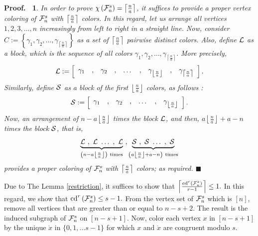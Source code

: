 \documentclass[11pt]{article}
\newtheorem{preproof}{{\bf Proof.\ }}
\newenvironment{proof}[1]{\begin{preproof}{\rm
               #1}\hfill{$\blacksquare$}}{\end{preproof}}
\begin{document}
\begin{proof}
{		\noindent
		In order to prove
		$\chi \left(  {\cal F}_{n}^{s}  \right) = \left\lceil   \frac{n}{a}   \right\rceil$,
		it suffices to provide a proper vertex coloring of $ {\cal F}_{n}^{s} $
		with $\left\lceil   \frac{n}{a}   \right\rceil$ colors.
		In this regard, let us arrange all vertices $1, 2, 3, \dots , n$ increasingly from left to right in a straight line.
		Now, consider $C:= \left\{\gamma _{1} , \gamma _{2} , \dots , \gamma _{\left\lceil   \frac{n}{a}   \right\rceil} \right\}$ as a set of $\left\lceil   \frac{n}{a}   \right\rceil$ pairwise distinct colors. Also, define ${\cal L}$ as a block, which is the sequence of all colors $\gamma _{1} , \gamma _{2} , \dots , \gamma _{\left\lceil   \frac{n}{a}   \right\rceil}.$ More precisely,
		$${\cal L} := \left[\begin{array}{ccccccccc}
			\gamma _{1} &  ,   &   \gamma _{2} &  ,   &    \dots &   ,   &   \gamma _{\left\lfloor \frac{n}{a} \right\rfloor}  &  ,   &   
			\gamma _{\left\lceil   \frac{n}{a}   \right\rceil}
		\end{array}\right] .$$
		Similarly, define ${\cal S}$ as a block of the first
		$\left\lfloor \frac{n}{a} \right\rfloor$ colors, as follows :
		$${\cal S} := \left[\begin{array}{ccccccc}
			\gamma _{1} &  ,   &   \gamma _{2} &  ,   &    \dots &   ,   &   \gamma _{\left\lfloor \frac{n}{a} \right\rfloor}  
		\end{array}\right] .$$
		Now, an arrangement of $  n-a {\left\lfloor \frac{n}{a} \right\rfloor} $
		times the block ${\cal L}$, and then, $a {\left\lfloor \frac{n}{a} \right\rfloor} + a - n$
		times the block ${\cal S}$, that is, 
		$$\underbrace{{\cal L} \ , \  {\cal L} \ \dots \ , \ {\cal L}}_{ \left(  n-a \left\lfloor \frac{n}{a} \right\rfloor  \right) \ {\rm times}} \ ,
		\underbrace{{\cal S} \ , \  {\cal S} \ \dots \ , \ {\cal S}}_{ \left(  a {\left\lfloor \frac{n}{a} \right\rfloor} + a - n  \right) \ {\rm times}} $$
		provides a proper coloring of $ {\cal F}_{n}^{s} $ with
		$\left\lceil   \frac{n}{a}   \right\rceil$ colors; as required.
	}
\end{proof}



        Due to The Lemma \ref*{restriction}, it suffices to show that
		$\left\lceil  \frac{{\rm cd}^r \left({\cal F}_{n}^{s}\right)}{r-1}   \right\rceil \leq 1.$ In this regard, we show that ${\rm cd}^r \left({\cal F}_{n}^{s}\right) \leq s-1 .$
		From the vertex set of ${\cal F}_{n}^{s}$ which is $[n]$, remove all vertices that are greater than or equal to $n-s+2$. The result is the induced subgraph of ${\cal F}_{n}^{s}$ on $[n-s+1]$. Now, color each vertex $x$ in $[n-s+1]$ by the unique $\mathring{x}$ in
		$\{0,1, \dots s-1\}$ for which $x$ and $\mathring{x}$ are congruent modulo $s$.
		
\end{document}
